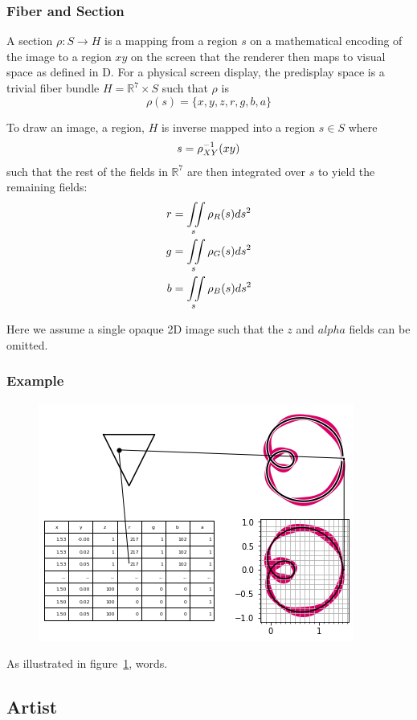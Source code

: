 \documentclass[../main.tex]{subfiles}
\begin{document}
\subsubsection{Fiber and Section}
A section $\rho: S \rightarrow H$ is a mapping from a region $s$ on a mathematical encoding of the image to a region $xy$ on the screen that the renderer then maps to visual space as defined in D. For a physical screen display, the predisplay space is a trivial fiber bundle $H=\mathbb{R}^{7}\times S$ such that $\rho$ is
\begin{equation}
    \rho(s)  = \{x, y, z, r, g, b, a\}
    \label{eq:rho}
\end{equation}

To draw an image, a region, $H$ is inverse mapped into a region $s \in S$ where
\begin{equation}
s = \rho^{-1}_{\tiny{XY}}(xy)
\end{equation}
such that the rest of the fields in $\mathbb{R}^{7}$ are then integrated over $s$ to yield the remaining fields:
\begin{align}
    r &= \iint\limits_s \rho_{\tiny{R}}(s)ds^{2}\\
    g &= \iint\limits_s \rho_{\tiny{G}}(s)ds^{2}\\
    b &= \iint\limits_s \rho_{\tiny{B}}(s)ds^{2}
\end{align}

Here we assume a single opaque 2D image such that the $z$ and $alpha$ fields can be omitted. 

\subsubsection{{Example}}
\begin{figure}[h]
    \includegraphics[width=.4\linewidth]{figures/sections/math/render.png}
    \caption{}
    \label{fig:render}
\end{figure}

As illustrated in figure~\ref{fig:render}, words.

\subsection{Artist}
\end{document}
